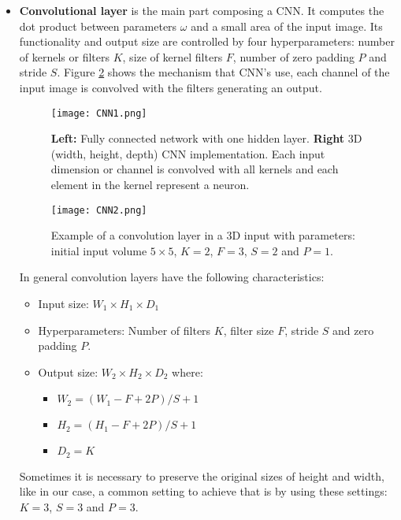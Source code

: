 \begin{itemize}
\item \textbf{Convolutional layer} is the main part composing a CNN. It computes the dot product between parameters $\omega$ and a small area of the input image. Its  functionality and output size are controlled by four hyperparameters: number of kernels or filters $K$, size of kernel filters $F$, number of zero padding $P$ and stride $S$. Figure \ref{fig:CNNim2} shows the mechanism that  CNN's use, each channel of the input image is convolved with the filters generating an output.  \

\begin{figure}[!tb] 
\centering 
\texttt{[image: CNN1.png]} 
\caption[Fully connected network VS CNN]{\textbf{Left:} Fully connected network with one hidden layer. \textbf{Right} 3D (width, height, depth) CNN implementation. Each input dimension or channel is convolved with all kernels and each element in the kernel represent a neuron.}
\label{fig:CNNim1} 
\end{figure}
\begin{figure}[!tb] 
\centering 
\texttt{[image: CNN2.png]} 
\caption[Convolution layer]{Example of a convolution layer in a 3D input with parameters: initial input volume $5 \times 5$, $K=2$, $F=3$, $S=2$ and $P=1$.}
\label{fig:CNNim2} 
\end{figure}


In general convolution layers have the following characteristics:
\begin{itemize}
\item Input size: \boldmath$W_1 \times H_1 \times D_1$
\item Hyperparameters: Number of filters \boldmath$K$, filter size \boldmath$F$, stride \boldmath$S$ and zero padding \boldmath$P$.  
\item Output size: \boldmath$W_2 \times H_2 \times D_2$ where:
\begin{itemize} \label{sec:outCNN}
\item \boldmath$W_2 = ( W_1 - F + 2P) / S + 1 $
\item \boldmath$H_2 = ( H_1 - F + 2P) / S + 1 $
\item \boldmath$D_2 = K $
\end{itemize}
\end{itemize}

Sometimes it is necessary to preserve the original sizes of height and width, like in our case, a common setting to achieve that is by using these settings: $K =3$, $S =3$ and $P =3$.   


\end{itemize}

